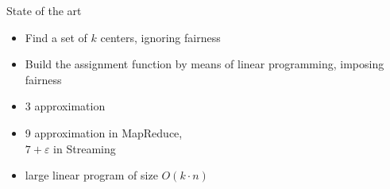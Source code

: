 \documentclass{beamer}
\renewcommand{\epsilon}{\varepsilon}
\begin{document}
\begin{frame}{State of the art}

  \begin{itemize}
    \item Find a set of $k$ centers, ignoring fairness
    \item Build the assignment function by means of linear programming, imposing fairness
  \end{itemize}

  \vfill

  \begin{itemize}
    \pause\item $3$ approximation~\cite{DBLP:conf/nips/BeraCFN19,DBLP:conf/nips/HarbL20}
    \pause\item 9 approximation in MapReduce,\\ $7+\epsilon$ in Streaming~\cite{DBLP:conf/www/BeraDGK22}
    \pause\item large linear program of size $O(k\cdot n)$
  \end{itemize}



%
\end{frame}
\end{document}
